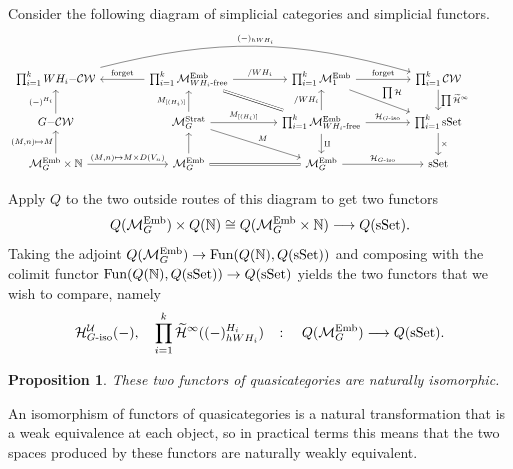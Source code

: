 \documentclass[11pt]{amsart}
\newtheorem{prop}{Proposition}[section]
\theoremstyle{definition}
\numberwithin{equation}{section}
\numberwithin{figure}{section}
\newcommand{\N}{\mathbb N}
\newcommand{\ra}{\longrightarrow}
\newcommand{\mc}{\mathcal}
\newcommand{\Fun}{\textup{Fun}}
\newcommand{\sSet}{\textup{sSet}}
\newcommand{\Man}{\mc M^\mathrm{Emb}}
\newcommand{\Manstr}{\mc M^\mathrm{Strat}}
\newcommand{\dashiso}{\textrm{-}\mathrm{iso}}
\begin{document}
Consider the following diagram of simplicial categories and simplicial functors.
\[ \begin{tikzcd}[column sep = 4em]
	\prod_{i=1}^k WH_i\mc{-CW} \ar[bend left = 15]{rrr}{(-)_{hWH_i}} & \prod_{i=1}^k \Man_{\textup{$WH_i$-free}} \rar{/WH_i} \lar[swap]{\textup{forget}} \ar[equals]{rd} & \prod_{i=1}^k \Man_{1} \ar{rd}{\prod \mc H} \rar{\textup{forget}} & \prod_{i=1}^k \mc{CW} \dar{\prod \widetilde{\mc H}^\infty} & \\
	G\mc{-CW} \uar{(-)^{H_i}} & \Manstr_G \rar{M_{[(H_i)]}} \uar{M_{[(H_i)]}} \ar{rd}{M} & \prod_{i=1}^k \Man_{\textup{$WH_i$-free}} \uar{/WH_i} \dar{\amalg} \rar{\mc H_{G\dashiso}} & \prod_{i=1}^k \sSet \dar{\times} \\
	\Man_G \times \N \uar{(M,n) \mapsto M} \rar{(M,n) \mapsto M \times D(V_n)} & \Man_G \uar \rar[equals] & \Man_G \rar{\mc H_{G\dashiso}} & \sSet
\end{tikzcd} \]

Apply $Q$ to the two outside routes of this diagram to get two functors
\[ Q(\Man_G) \times Q(\N) \cong Q(\Man_G \times \N) \ra Q(\sSet). \]
Taking the adjoint $Q(\Man_G) \to \Fun(Q(\N),Q(\sSet))$ and composing with the colimit functor $\Fun(Q(\N),Q(\sSet)) \to Q(\sSet)$ yields the two functors that we wish to compare, namely
\[ \mc H_{G\dashiso}^{\mc U}(-), \quad \prod_{i=1}^k \widetilde{\mc H}^\infty((-)^{H_i}_{hWH_i}) \quad \colon \quad Q(\Man_G) \ra Q(\sSet). \]
\begin{prop}
	These two functors of quasicategories are naturally isomorphic.
\end{prop}

An isomorphism of functors of quasicategories is a natural transformation that is a weak equivalence at each object, so in practical terms this means that the two spaces produced by these functors are naturally weakly equivalent.
\end{document}
